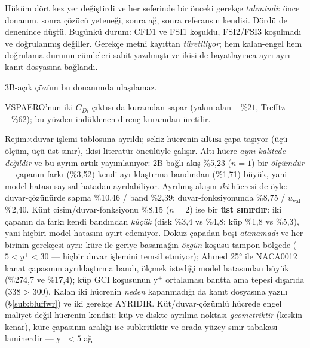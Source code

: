\documentclass[11pt,a4paper]{article}
\begin{document}
\begin{description}
        \noindent Hüküm dört kez yer değiştirdi ve her seferinde bir önceki
        gerekçe \emph{tahmindi}: önce donanım, sonra çözücü yeteneği, sonra
        ağ, sonra referansın kendisi. Dördü de denenince düştü. Bugünkü
        durum: CFD1 ve FSI1 koşuldu, FSI2/FSI3 koşulmadı ve doğrulanmış
        değiller. Gerekçe metni kayıttan \emph{türetiliyor}; hem kalan-engel
        hem doğrulama-durumu cümleleri sabit yazılmıştı ve ikisi de
        bayatlayınca ayrı ayrı kanıt dosyasına bağlandı.
  \item[Süpersonik mutlak $C_d$.] 3B-açık çözüm bu donanımda ulaşılamaz.
  \item[Panel yönteminin indüklenen direnci.] VSPAERO'nun iki $C_{Di}$ çıktısı
        da kuramdan sapar (yakın-alan $-\%21$, Trefftz $+\%62$); bu yüzden
        indüklenen direnç kuramdan üretilir.
  \item[Model-form belirsizliği.] Rejim$\times$duvar işlemi tablosuna ayrıldı;
        sekiz hücrenin \textbf{altısı} çapa taşıyor (üçü ölçüm, üçü üst
        sınır), ikisi literatür-öncülüyle
        çalışır. Altı hücre \emph{aynı kalitede değildir} ve bu ayrım artık
        yayımlanıyor: 2B bağlı akış \%5{,}23 ($n{=}1$) bir \emph{ölçümdür} ---
        çapanın farkı (\%3{,}52) kendi ayrıklaştırma bandından (\%1{,}71)
        büyük, yani model hatası sayısal hatadan ayrılabiliyor. Ayrılmış
        akışın \emph{iki} hücresi de öyle: duvar-çözünürde sapma \%10{,}46 /
        band \%2{,}39; duvar-fonksiyonunda \%8{,}75 / $u_{\mathrm{val}}$
        \%2{,}40. Künt
        cisim/duvar-fonksiyonu \%8{,}15 ($n{=}2$) ise bir \textbf{üst
        sınırdır}: iki çapanın da farkı kendi bandından \emph{küçük} (disk
        \%3{,}4 vs \%4{,}8; küp \%1{,}8 vs \%5{,}3), yani hiçbiri model
        hatasını ayırt edemiyor. Dokuz çapadan beşi \emph{atanamadı} ve her
        birinin gerekçesi ayrı: küre ile geriye-basamağın \emph{özgün} koşusu
        tampon bölgede ($5<y^+<30$ --- hiçbir duvar işlemini temsil etmiyor);
        Ahmed 25° ile NACA0012 kanat çapasının ayrıklaştırma bandı, ölçmek
        istediği model hatasından büyük (\%274{,}7 ve \%17{,}4); küp GCI
        koşusunun y$^+$ ortalaması bantta ama tepesi dışarıda (338 > 300).
        Kalan iki hücrenin \emph{neden} kapanmadığı da kanıt dosyasına yazılı
        (\S\ref{sub:bluffwr}) ve iki gerekçe AYRIDIR. Küt/duvar-çözümlü hücrede
        engel maliyet değil hücrenin kendisi: küp ve diskte ayrılma noktası
        \emph{geometriktir} (keskin kenar), küre çapasının aralığı ise
        subkritiktir ve orada yüzey sınır tabakası laminerdir --- y$^+{<}5$ ağ

\end{description}
\end{document}
